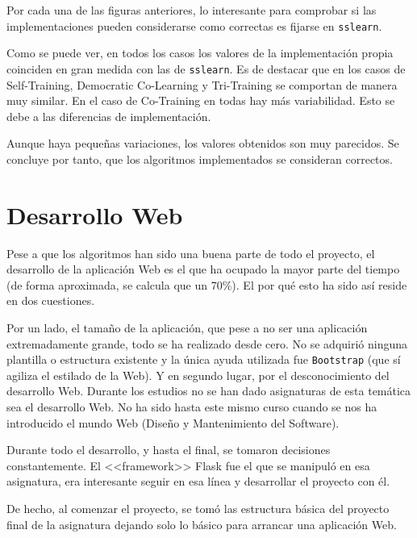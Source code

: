 



Por cada una de las figuras anteriores, lo interesante para comprobar si las
implementaciones pueden considerarse como correctas es fijarse en
\texttt{sslearn}.

Como se puede ver, en todos los casos los valores de la implementación propia
coinciden en gran medida con las de \texttt{sslearn}. Es de destacar que en los
casos de Self-Training, Democratic Co-Learning y Tri-Training se comportan de
manera muy similar. En el caso de Co-Training en todas hay más variabilidad.
Esto se debe a las diferencias de implementación.

Aunque haya pequeñas variaciones, los valores obtenidos son muy parecidos. Se
concluye por tanto, que los algoritmos implementados se consideran correctos.


\section{Desarrollo Web}

Pese a que los algoritmos han sido una buena parte de todo el proyecto, el
desarrollo de la aplicación Web es el que ha ocupado la mayor parte del tiempo
(de forma aproximada, se calcula que un 70\%). El por qué esto ha sido así
reside en dos cuestiones. 

Por un lado, el tamaño de la aplicación, que pese a no ser una aplicación
extremadamente grande, todo se ha realizado desde cero. No se adquirió ninguna
plantilla o estructura existente y la única ayuda utilizada fue
\texttt{Bootstrap} (que sí agiliza el estilado de la Web). Y en segundo lugar,
por el desconocimiento del desarrollo Web. Durante los estudios no se han dado
asignaturas de esta temática sea el desarrollo Web. No ha sido hasta este mismo
curso cuando se nos ha introducido el mundo Web (Diseño y Mantenimiento del
Software).

Durante todo el desarrollo, y hasta el final, se tomaron decisiones
constantemente. El <<framework>> Flask fue el que se manipuló en esa asignatura,
era interesante seguir en esa línea y desarrollar el proyecto con él. 

De hecho, al comenzar el proyecto, se tomó las estructura básica del proyecto
final de la asignatura dejando solo lo básico para arrancar una aplicación Web.

